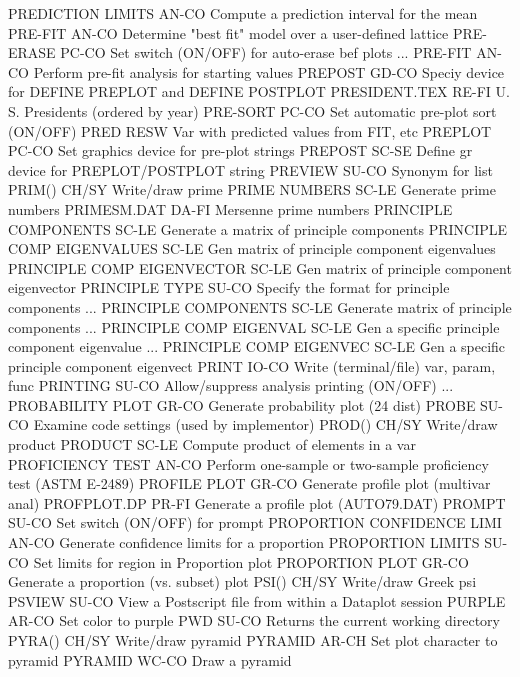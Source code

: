 PREDICTION LIMITS           AN-CO Compute a prediction interval for the mean
PRE-FIT                     AN-CO Determine "best fit" model over a user-defined lattice
PRE-ERASE                   PC-CO Set switch (ON/OFF) for auto-erase bef plots
... PRE-FIT                 AN-CO Perform pre-fit analysis for starting values
PREPOST                     GD-CO Speciy device for DEFINE PREPLOT and DEFINE POSTPLOT
PRESIDENT.TEX               RE-FI U. S. Presidents (ordered by year)
PRE-SORT                    PC-CO Set automatic pre-plot sort (ON/OFF)
PRED                        RESW  Var with predicted values from FIT, etc
PREPLOT                     PC-CO Set graphics device for pre-plot strings
PREPOST                     SC-SE Define gr device for PREPLOT/POSTPLOT string
PREVIEW                     SU-CO Synonym for list
PRIM()                      CH/SY Write/draw prime
PRIME NUMBERS               SC-LE Generate prime numbers
PRIMESM.DAT                 DA-FI Mersenne prime numbers
PRINCIPLE COMPONENTS        SC-LE Generate a matrix of principle components
PRINCIPLE COMP EIGENVALUES  SC-LE Gen matrix of principle component eigenvalues
PRINCIPLE COMP EIGENVECTOR  SC-LE Gen matrix of principle component eigenvector
PRINCIPLE TYPE              SU-CO Specify the format for principle components
... PRINCIPLE COMPONENTS    SC-LE Generate matrix of principle components
... PRINCIPLE COMP EIGENVAL SC-LE Gen a specific principle component eigenvalue
... PRINCIPLE COMP EIGENVEC SC-LE Gen a specific principle component eigenvect
PRINT                       IO-CO Write (terminal/file) var, param, func
PRINTING                    SU-CO Allow/suppress analysis printing (ON/OFF)
... PROBABILITY PLOT        GR-CO Generate probability plot (24 dist)
PROBE                       SU-CO Examine code settings (used by implementor)
PROD()                      CH/SY Write/draw product
PRODUCT                     SC-LE Compute product of elements in a var
PROFICIENCY TEST            AN-CO Perform one-sample or two-sample proficiency test (ASTM E-2489)
PROFILE PLOT                GR-CO Generate profile plot (multivar anal)
PROFPLOT.DP                 PR-FI Generate a profile plot (AUTO79.DAT)
PROMPT                      SU-CO Set switch (ON/OFF) for prompt
PROPORTION CONFIDENCE LIMI  AN-CO Generate confidence limits for a proportion
PROPORTION LIMITS           SU-CO Set limits for region in Proportion plot
PROPORTION PLOT             GR-CO Generate a proportion (vs. subset) plot
PSI()                       CH/SY Write/draw Greek psi
PSVIEW                      SU-CO View a Postscript file from within a Dataplot session
PURPLE                      AR-CO Set color to purple
PWD                         SU-CO Returns the current working directory
PYRA()                      CH/SY Write/draw pyramid
PYRAMID                     AR-CH Set plot character to pyramid
PYRAMID                     WC-CO Draw a pyramid

